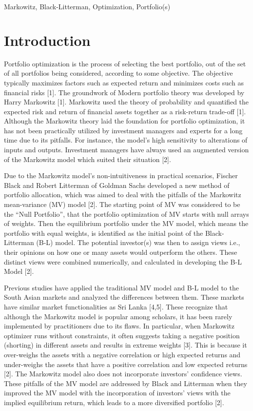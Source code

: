 \documentclass[conference]{IEEEtran}
\begin{document}
\begin{IEEEkeywords}
Markowitz, Black-Litterman, Optimization, Portfolio(s)
\end{IEEEkeywords}

\section{Introduction}
Portfolio optimization is the process of selecting the best portfolio, out of the set of all portfolios being considered, according to some objective. The objective typically maximizes factors such as expected return and minimizes costs such as financial risks [1]. The groundwork of Modern portfolio theory was developed by Harry Markowitz [1]. Markowitz used the theory of probability and quantified the expected risk and return of financial assets together as a risk-return trade-off [1]. Although the Markowitz theory laid the foundation for portfolio optimization, it has not been practically utilized by investment managers and experts for a long time due to its pitfalls. For instance, the model’s high sensitivity to alterations of inputs and outputs. Investment managers have always used an augmented version of the Markowitz model which suited their situation [2].

Due to the Markowitz model’s non-intuitiveness in practical scenarios, Fischer Black and Robert Litterman of Goldman Sachs developed a new method of portfolio allocation, which was aimed to deal with the pitfalls of the Markowitz mean-variance (MV) model [2]. The starting point of MV was considered to be the “Null Portfolio”, that the portfolio optimization of MV starts with null arrays of weights. Then the  equilibrium portfolio under the MV model, which means the portfolio with equal weights, is identified as the initial point of the Black-Litterman (B-L) model. The potential investor(s) was then to assign views i.e., their opinions on how one or many assets would outperform the others. These distinct views were combined numerically, and calculated in developing the B-L Model [2].

Previous studies have applied the traditional MV model and B-L model to the South Asian markets and analyzed the differences between them. These markets have similar market functionalities as Sri Lanka [4,5]. These recognize that although the Markowitz model is popular among scholars, it has been rarely implemented by practitioners due to its flaws. In particular, when Markowitz optimizer runs without constraints, it often suggests taking a negative position (shorting) in different assets and results in extreme weights [3]. This is because it over-weighs the assets with a negative correlation or high expected returns and under-weighs the assets that have a positive correlation and low expected returns [2]. The Markowitz model also does not incorporate investors’ confidence views. These pitfalls of the MV model are addressed by Black and Litterman when they improved the MV model with the incorporation of investors' views with the implied equilibrium return, which leads to a more diversified portfolio [2]. 
\end{document}
